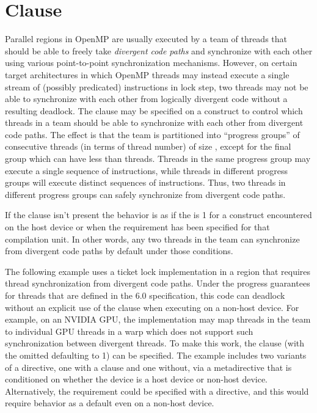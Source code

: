 \section{ Clause}
\label{sec:safesync}


Parallel regions in OpenMP are usually executed by a team of threads that
should be able to freely take \emph{divergent code paths} and synchronize with
each other using various point-to-point synchronization mechanisms. However, on
certain target architectures in which OpenMP threads may instead execute a
single stream of (possibly predicated) instructions in lock step, two threads
may not be able to synchronize with each other from logically divergent code
without a resulting deadlock. The  clause may be
specified on a  construct to control which threads in a team
should be able to synchronize with each other from divergent code paths. The
effect is that the team is partitioned into ``progress groups'' of consecutive
threads (in terms of thread number) of size , except for the final
group which can have less than  threads. Threads in the same
progress group may execute a single sequence of instructions, while threads in
different progress groups will execute distinct sequences of instructions. Thus,
two threads in different progress groups can safely synchronize from divergent
code paths.

If the  clause isn't present the behavior is as if the
 is 1 for a  construct encountered on the host
device or when the  requirement has been specified for
that compilation unit. In other words, any two threads in the team can
synchronize from divergent code paths by default under those conditions.

The following example uses a ticket lock implementation in a 
region that requires thread synchronization from divergent code paths. Under
the progress guarantees for threads that are defined in the 6.0 specification,
this code can deadlock without an explicit use of the  clause
when executing on a non-host device. For example, on an NVIDIA GPU, the
implementation may map threads in the team to individual GPU threads in a warp
which does not support such synchronization between divergent threads. To make
this work, the  clause (with the omitted 
defaulting to 1) can be specified. The example includes two variants of a
 directive, one with a  clause and one without,
via a metadirective that is conditioned on whether the device is a host device
or non-host device. Alternatively, the  requirement
could be specified with a  directive, and this would require
 behavior as a default even on a non-host device.


